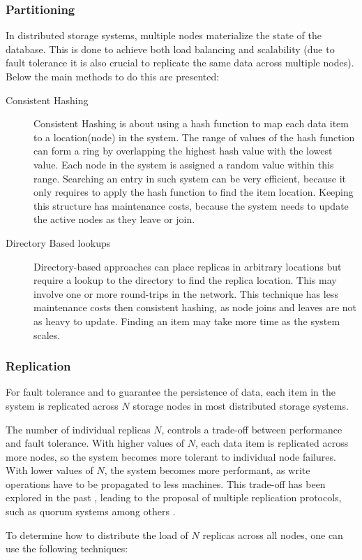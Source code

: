 \subsubsection{Partitioning}
\label{sec:partitioning}
In distributed storage systems, multiple nodes materialize the state of the database. This is done to achieve both load balancing and scalability (due to fault tolerance it is also crucial to replicate the same data across multiple nodes). Below the main methods to do this are presented:

\begin{description}
\item[Consistent Hashing] Consistent Hashing\cite{consistent_hashing} is about using a hash function to map each data item to a location(node) in the system. The range of values of the hash function can form a ring by overlapping the highest hash value with the lowest value. Each node in the system is assigned a random value within this range. Searching an entry in such system can be very efficient, because it only requires to apply the hash function to find the item location. Keeping this structure has maintenance costs, because the system needs to update the active nodes as they leave or join.

\item[Directory Based lookups]\cite{data_replication_p2p} Directory-based approaches can place replicas in arbitrary locations but require a lookup to the directory to find the replica location. This may involve one or more round-trips in the network. This technique has less maintenance costs then consistent hashing, as node joins and leaves are not as heavy to update. Finding an item may take more time as the system scales.

\end{description}

\subsubsection{Replication}
\label{sec:replication}
For fault tolerance and to guarantee the persistence of data\cite{data_replication_p2p}, each item in the system is replicated across $N$ storage nodes in most distributed storage systems.\par
	The number of individual replicas $N$, controls a trade-off between performance and fault tolerance. With higher values of $N$, each data item is replicated across more nodes, so the system becomes more tolerant to individual node failures. With lower values of $N$, the system becomes more performant, as write operations have to be propagated to less machines. This trade-off has been explored in the past \cite{cap}, leading to the proposal of multiple replication protocols, such as quorum systems \cite{quorum_commit} among others \cite{state_machine_replication, atomic_broadcast}.\par
	To determine how to distribute the load of $N$ replicas across all nodes, one can use the following techniques:
	
